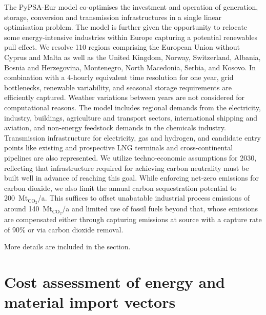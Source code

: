 \documentclass[5p,10pt]{elsarticle}
\begin{document}
The PyPSA-Eur\cite{PyPSAEurSecSectorCoupled} model co-optimises the investment
and operation of generation, storage, conversion and transmission
infrastructures in a single linear optimisation problem. The model is further
given the opportunity to relocate some energy-intensive industries within Europe
capturing a potential renewables pull
effect.\cite{verpoortEstimatingRenewables2023,samadiRenewablesPull2023} We
resolve 110 regions comprising the European Union without Cyprus and Malta as
well as the United Kingdom, Norway, Switzerland, Albania, Bosnia and
Herzegovina, Montenegro, North Macedonia, Serbia, and Kosovo. In combination
with a 4-hourly equivalent time resolution for one year, grid bottlenecks,
renewable variability, and seasonal storage requirements are efficiently
captured. Weather variations between years are not considered for computational
reasons. The model includes regional demands from the electricity, industry,
buildings, agriculture and transport sectors, international shipping and
aviation, and non-energy feedstock demands in the chemicals industry.
Transmission infrastructure for electricity, gas and hydrogen, and candidate
entry points like existing and prospective LNG terminals and cross-continental
pipelines are also represented. We utilize techno-economic assumptions for
2030\cite{dea2019}, reflecting that infrastructure required for achieving carbon
neutrality must be built well in advance of reaching this goal. While enforcing
net-zero emissions for carbon dioxide, we also limit the annual carbon
sequestration potential to 200~Mt$_{\text{CO}_2}$/a. This suffices to offset
unabatable industrial process emissions of around 140~Mt$_{\text{CO}_2}$/a and
limited use of fossil fuels beyond that, whose emissions are compensated either
through capturing emissions at source with a capture rate of 90\% or via carbon
dioxide removal.

More details are included in the  section.


\section*{Cost assessment of energy and material import vectors}

\end{document}

